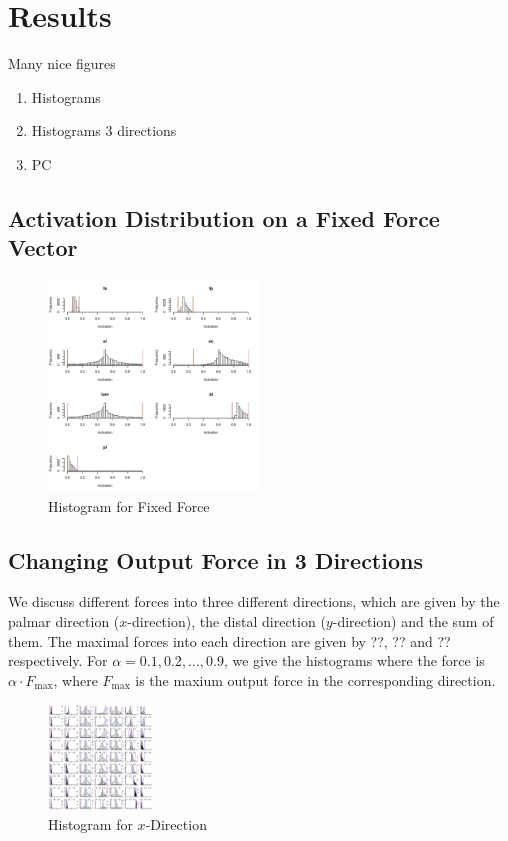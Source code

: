 \section{Results}
Many nice figures
\begin{enumerate}
	\item Histograms
	\item Histograms 3 directions
	\item PC
\end{enumerate}

\subsection{Activation Distribution on a  Fixed Force Vector}

\begin{figure}[ht]
   \begin{center}
    \includegraphics[width=0.5\textwidth]{figs/raw_histograms.pdf}
  \end{center}
  \caption{Histogram for Fixed Force}
  \label{fig_rawhisto}
\end{figure}


\subsection{Changing Output Force in 3 Directions}
We discuss different forces into three different directions, which are given by the palmar direction ($x$-direction), the distal direction ($y$-direction) and the sum of them. The maximal forces into each direction are given by ??, ?? and ?? respectively. For $\alpha = 0.1, 0.2, \dots, 0.9$, we give the histograms where the force is $\alpha \cdot F_{\max}$, where $F_{\max}$ is the maxium output force in the corresponding direction. 

\begin{figure}[ht]
   \begin{center}
    \includegraphics[width=0.25\textwidth]{XalphaProgression.pdf}
  \end{center}
  \caption{Histogram for $x$-Direction}
  \label{fig_xhisto}
\end{figure}

